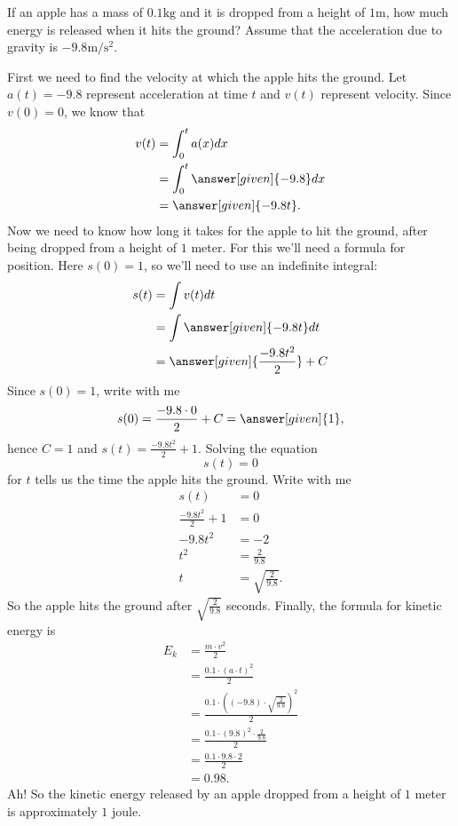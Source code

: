 \documentclass{ximera}
\begin{document}
\begin{example}
  If an apple has a mass of $0.1\mathrm{kg}$ and it is dropped from a
  height of $1\mathrm{m}$, how much energy is released when it hits the
  ground? Assume that the acceleration due to gravity is
  $-9.8\mathrm{m}/\mathrm{s}^2$.
  \begin{explanation}
    First we need to find the velocity at which the apple hits the
    ground. Let $a(t)=-9.8$ represent acceleration at time $t$ and $v(t)$
    represent velocity. Since $v(0) = 0$, we know that
    \begin{align*}
      v(t) &= \int_0^t a(x) dx\\
      &= \int_0^t \answer[given]{-9.8} dx \\
      &= \answer[given]{-9.8t}.
    \end{align*}
    Now we need to know how long it takes for the apple to hit the
    ground, after being dropped from a height of $1$ meter. For this
    we'll need a formula for position. Here $s(0) = 1$, so we'll need
    to use an indefinite integral:
    \begin{align*}
      s(t)&=\int v(t) dt\\
      &= \int \answer[given]{-9.8t} dt \\
      &= \answer[given]{\frac{-9.8 t^2}{2}} + C
    \end{align*}
    Since $s(0)= 1$, write with me
    \[
    s(0) = \frac{-9.8 \cdot 0}{2} + C = \answer[given]{1},
    \]
    hence $C =1$ and $s(t) = \frac{-9.8 t^2}{2}+1$. Solving the equation
    \[
    s(t) = 0
    \]
    for $t$ tells us the time the apple hits the ground. Write with me
    \begin{align*}
      s(t) &= 0 \\
      \frac{-9.8 t^2}{2} +1 &= 0\\
      -9.8 t^2 &=-2\\
      t^2 &=\frac{2}{9.8}\\
      t &=\sqrt{\frac{2}{9.8}}.
    \end{align*}
    So the apple hits the ground after $\sqrt{\frac{2}{9.8}}$ seconds.
    Finally, the formula for kinetic energy is
    \begin{align*}
    E_k &= \frac{m \cdot v^2}{2} \\
    &= \frac{0.1 \cdot \left(a\cdot t\right)^2}{2} \\
    &= \frac{0.1 \cdot \left((-9.8)\cdot \sqrt{\frac{2}{9.8}}\right)^2}{2} \\
    &= \frac{0.1 \cdot (9.8)^2\cdot\frac{2}{9.8}}{2} \\
    &= \frac{0.1 \cdot 9.8\cdot 2}{2} \\
    &= 0.98.
    \end{align*}
    Ah! So the kinetic energy released by an apple dropped from a
    height of $1$ meter is approximately $1$ joule.
  \end{explanation}
\end{example}
\end{document}
